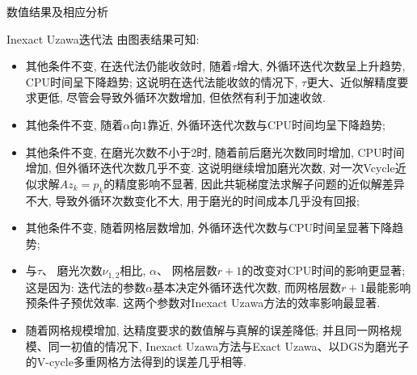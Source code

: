 \documentclass{article}
\begin{document}
\begin{section}{数值结果及相应分析}
\begin{subsection}{Inexact Uzawa迭代法}
        由图表结果可知:
        \begin{itemize}
            \item 其他条件不变, 在迭代法仍能收敛时, 随着$\tau$增大, 外循环迭代次数呈上升趋势, CPU时间呈下降趋势; 这说明在迭代法能收敛的情况下, $\tau$更大、近似解精度要求更低, 尽管会导致外循环次数增加, 但依然有利于加速收敛.
            \item 其他条件不变, 随着$\alpha$向$1$靠近, 外循环迭代次数与CPU时间均呈下降趋势;
            \item 其他条件不变, 在磨光次数不小于2时, 随着前后磨光次数同时增加, CPU时间增加, 但外循环迭代次数几乎不变. 这说明继续增加磨光次数, 对一次Vcycle近似求解$Az_k=p_k$的精度影响不显著, 因此共轭梯度法求解子问题的近似解差异不大, 
            导致外循环次数变化不大, 用于磨光的时间成本几乎没有回报;
            \item 其他条件不变, 随着网格层数增加, 外循环迭代次数与CPU时间呈显著下降趋势;
            \item 与$\tau$、 磨光次数$\nu_{1,2}$相比, $\alpha$、 网格层数$r+1$的改变对CPU时间的影响更显著; 这是因为: 迭代法的参数$\alpha$基本决定外循环迭代次数, 而网格层数$r+1$最能影响预条件子预优效率. 这两个参数对Inexact Uzawa方法的效率影响最显著.
            \item 随着网格规模增加, 达精度要求的数值解与真解的误差降低; 并且同一网格规模、同一初值的情况下, 
            Inexact Uzawa方法与Exact Uzawa、以DGS为磨光子的V-cycle多重网格方法得到的误差几乎相等.
            
        \end{itemize}
    \end{subsection}
\end{section}
\end{document}
